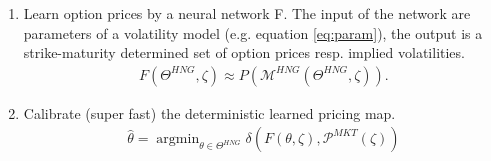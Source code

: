 \documentclass{article}
\DeclareMathOperator*{\argmin}{argmin}
\begin{document}
\begin{enumerate}
    \item Learn option prices by a neural network F. The input of the network are parameters of a volatility model (e.g. equation \eqref{eq:param}), the output is a strike-maturity determined set of option prices resp. implied volatilities.
    \begin{align*}
        F(\Theta^{HNG}, \zeta) \approx P(\mathcal{M}^{HNG}(\Theta^{HNG}, \zeta)). 
    \end{align*}
    \item Calibrate (super fast) the deterministic learned pricing map.
    \begin{align*}
         \hat{\theta} = \argmin_{\theta\in \Theta^{HNG}} \delta(F(\theta, \zeta), \mathcal{P}^{MKT}(\zeta))
    \end{align*}
\end{enumerate}
\end{document}
